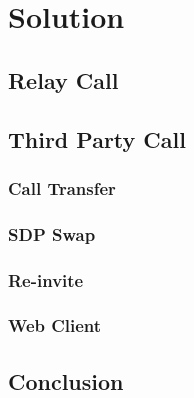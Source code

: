 \chapter{Solution}
\label{sec:Solution}

\section{Relay Call}
\label{sec:Solution:RelayCall}

\section{Third Party Call}
\label{sec:Solution:ThirdPartyCall}


\subsection{Call Transfer}
\label{sec:Solution:ThirdPartyCall:CallTransfer}


\subsection{SDP Swap}
\label{sec:Solution:ThirdPartyCall:SDPSwep}

\subsection{Re-invite}
\label{sec:Solution:ThirdPartyCall:Re-invite}

\subsection{Web Client}
\label{sec:Solution:ThirdPartyCall:WebClient}


\section{Conclusion}
\label{sec:Solution:Conclusion}





